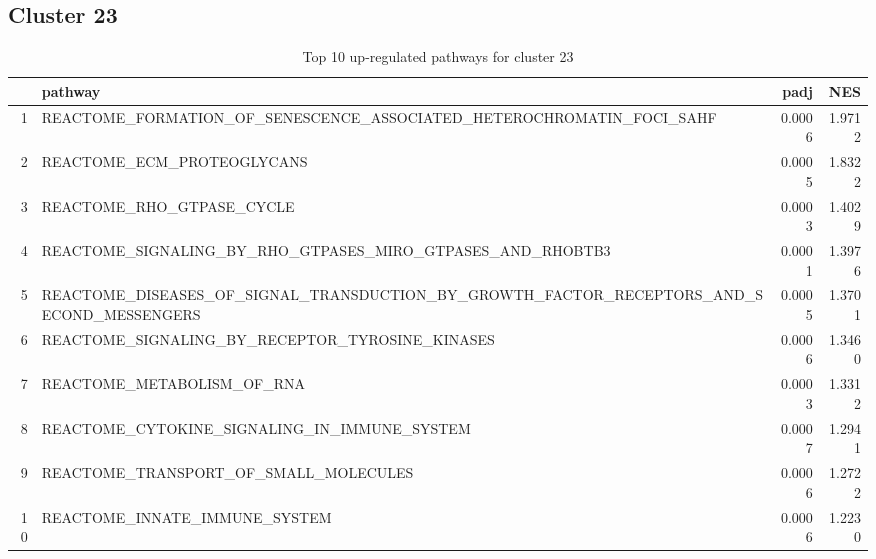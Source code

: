 \documentclass{article}
\begin{document}
\subsection{Cluster 23 }
\begin{table}[H]
\centering
\begin{tabularx}{\textwidth}{rlrr}
  \hline
 & pathway & padj & NES \\ 
  \hline
1 & REACTOME\_FORMATION\_OF\_SENESCENCE\_ASSOCIATED\_HETEROCHROMATIN\_FOCI\_SAHF & 0.0006 & 1.9712 \\ 
  2 & REACTOME\_ECM\_PROTEOGLYCANS & 0.0005 & 1.8322 \\ 
  3 & REACTOME\_RHO\_GTPASE\_CYCLE & 0.0003 & 1.4029 \\ 
  4 & REACTOME\_SIGNALING\_BY\_RHO\_GTPASES\_MIRO\_GTPASES\_AND\_RHOBTB3 & 0.0001 & 1.3976 \\ 
  5 & REACTOME\_DISEASES\_OF\_SIGNAL\_TRANSDUCTION\_BY\_GROWTH\_FACTOR\_RECEPTORS\_AND\_SECOND\_MESSENGERS & 0.0005 & 1.3701 \\ 
  6 & REACTOME\_SIGNALING\_BY\_RECEPTOR\_TYROSINE\_KINASES & 0.0006 & 1.3460 \\ 
  7 & REACTOME\_METABOLISM\_OF\_RNA & 0.0003 & 1.3312 \\ 
  8 & REACTOME\_CYTOKINE\_SIGNALING\_IN\_IMMUNE\_SYSTEM & 0.0007 & 1.2941 \\ 
  9 & REACTOME\_TRANSPORT\_OF\_SMALL\_MOLECULES & 0.0006 & 1.2722 \\ 
  10 & REACTOME\_INNATE\_IMMUNE\_SYSTEM & 0.0006 & 1.2230 \\ 
   \hline
\end{tabularx}
\caption{Top 10 up-regulated pathways for cluster 23} 
\label{tab:q3_2_23}
\end{table}
\end{document}
